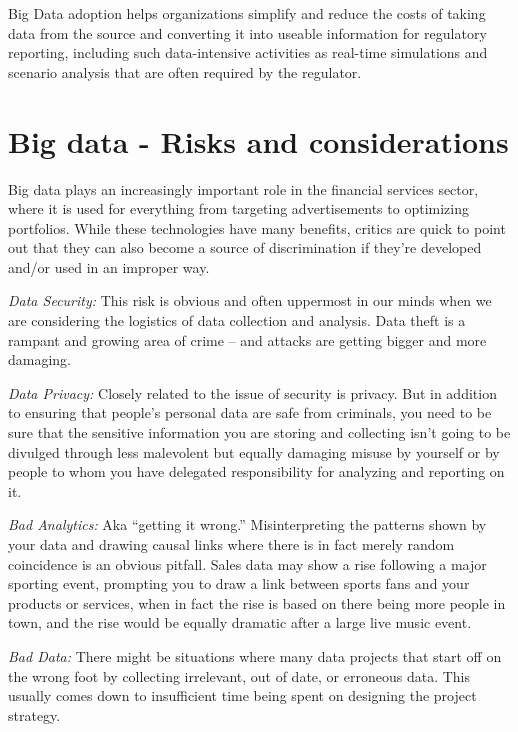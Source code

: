 \documentclass[sigconf]{acmart}
\begin{document}
Big Data adoption helps organizations
simplify and reduce the costs of taking
data from the source and converting it
into useable information for regulatory
reporting, including such data-intensive
activities as real-time simulations and
scenario analysis that are often required
by the regulator.


\section{Big data - Risks and considerations}

Big data plays an increasingly important role in the financial services sector, where it is used for everything from targeting advertisements to optimizing portfolios. While these technologies have many benefits, critics are quick to point out that they can also become a source of discrimination if they're developed and/or used in an improper way.\cite{risk-with-bigdata}

\textit{Data Security:} This risk is obvious and often uppermost in our minds when we are considering the logistics of data collection and analysis. Data theft is a rampant and growing area of crime – and attacks are getting bigger and more damaging. \cite{5risks-bigdata}

\textit{Data Privacy:} Closely related to the issue of security is privacy. But in addition to ensuring that people’s personal data are safe from criminals, you need to be sure that the sensitive information you are storing and collecting isn’t going to be divulged through less malevolent but equally damaging misuse by yourself or by people to whom you have delegated responsibility for analyzing and reporting on it.\cite{5risks-bigdata}

\textit{Bad Analytics:} Aka “getting it wrong.” Misinterpreting the patterns shown by your data and drawing causal links where there is in fact merely random coincidence is an obvious pitfall. Sales data may show a rise following a major sporting event, prompting you to draw a link between sports fans and your products or services, when in fact the rise is based on there being more people in town, and the rise would be equally dramatic after a large live music event.\cite{5risks-bigdata}

\textit{Bad Data:} There might be situations where many data projects that start off on the wrong foot by collecting irrelevant, out of date, or erroneous data. This usually comes down to insufficient time being spent on designing the project strategy.\cite{5risks-bigdata}
\end{document}
